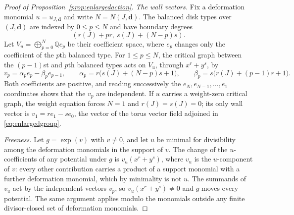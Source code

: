 \documentclass[11pt]{amsart}
\theoremstyle{definition}
\theoremstyle{remark}
\newcommand{\QQ}{\mathbb{Q}}
\begin{document}
\begin{proof}[Proof of Proposition~\ref{prop:enlargedaction}]
\emph{The wall vectors.}  Fix a deformation monomial $u=u_{J,\mathbf d}$ and
write $N=N(J,\mathbf d)$.  The balanced disk types over $(J,\mathbf d)$ are
indexed by $0\le p\le N$ and have boundary degrees
\[
 (r(J)+pr,\ s(J)+(N-p)s).
\]
Let $V_u=\bigoplus_{p=0}^{N}\QQ e_p$ be their coefficient space, where $e_p$
changes only the coefficient of the $p$th balanced type.  For $1\le p\le N$,
the critical graph between the $(p-1)$st and $p$th balanced types acts on
$V_u$, through $x^r+y^s$, by
\[
 v_p=\alpha_pe_p-\beta_pe_{p-1},\qquad
 \alpha_p=r\bigl(s(J)+(N-p)s+1\bigr),\qquad
 \beta_p=s\bigl(r(J)+(p-1)r+1\bigr).
\]
Both coefficients are positive, and reading successively the
$e_N,e_{N-1},\ldots,e_1$ coordinates shows that the $v_p$ are independent.  If
$u$ carries a weight-zero critical graph, the weight equation forces $N=1$ and
$r(J)=s(J)=0$; its only wall vector is $v_1=re_1-se_0$, the vector of the
torus vector field adjoined in \eqref{eq:enlargedgroup}.

\emph{Freeness.}  Let $g=\exp(v)$ with $v\ne0$, and let $u$ be minimal for
divisibility among the deformation monomials in the support of $v$.  The
change of the $u$-coefficients of any potential under $g$ is $v_u(x^r+y^s)$,
where $v_u$ is the $u$-component of $v$: every other contribution carries a
product of a support monomial with a further deformation monomial, which by
minimality is not $u$.  The summands of $v_u$ act by the independent vectors
$v_p$, so $v_u(x^r+y^s)\ne0$ and $g$ moves every potential.  The same
argument applies modulo the monomials outside any finite divisor-closed set
of deformation monomials.


\end{proof}
\end{document}
